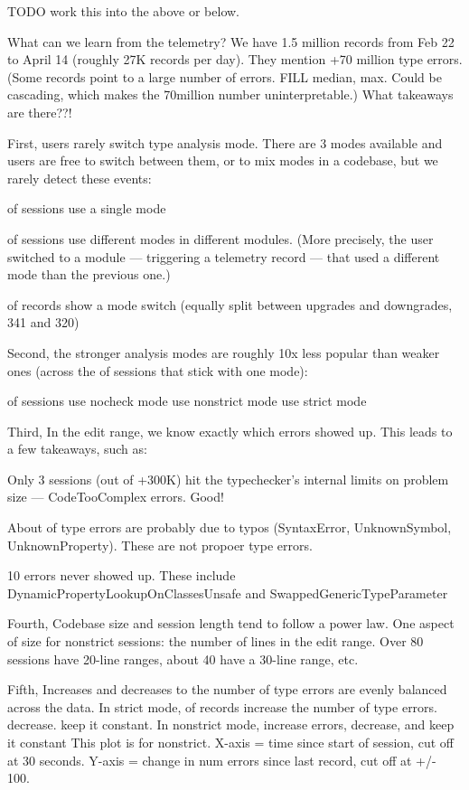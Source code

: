 \documentclass[english,submission,cleveref]{programming}
\begin{document}
TODO work this into the above or below.

What can we learn from the telemetry? We have 1.5 million records from Feb 22
to April 14 (roughly 27K records per day).
They mention +70 million type errors.
(Some records point to a large number of errors. FILL median, max. Could be cascading,
which makes the 70million number uninterpretable.)
What takeaways are there??!

First,
users rarely switch type analysis mode. There are 3 modes available and users
are free to switch between them, or to mix modes in a codebase, but we rarely
detect these events:

 of sessions use a single mode

 of sessions use different modes in different modules. (More
precisely, the user switched to a module --- triggering a telemetry record ---
that used a different mode than the previous one.)

 of records show a mode switch (equally split between upgrades and
downgrades, 341 and 320)


Second,
the stronger analysis modes are roughly 10x less popular than weaker ones
(across the  of sessions that stick with one mode):

 of sessions use nocheck mode
 use nonstrict mode
 use strict mode

Third,
In the edit range, we know exactly which errors showed up. This leads to a few
takeaways, such as:

Only 3 sessions (out of +300K) hit the typechecker's internal limits on problem
size --- CodeTooComplex errors. Good!

About  of type errors are probably due to typos (SyntaxError, UnknownSymbol,
UnknownProperty). These are not propoer type errors.

10 errors never showed up. These include DynamicPropertyLookupOnClassesUnsafe and
SwappedGenericTypeParameter


Fourth,
Codebase size and session length tend to follow a power law. 
One aspect of size for nonstrict sessions: the number of
lines in the edit range. Over 80 sessions have 20-line ranges, about 40 have a
30-line range, etc.

Fifth,
Increases and decreases to the number of type errors are evenly balanced across
the data.
In strict mode,  of records increase the number of type errors. 
decrease.  keep it constant.
In nonstrict mode,  increase errors,  decrease, and 
keep it constant
This plot is for nonstrict. X-axis = time since start of session, cut off at 30
seconds. Y-axis = change in num errors since last record, cut off at +/- 100.
\end{document}
